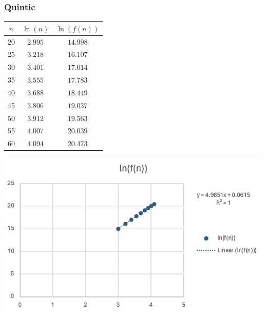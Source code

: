\documentclass{article}
\begin{document}
    \subsubsection{Quintic}

\begin{minipage}{0.3\textwidth} %
    \centering

    
    
    \begin{tabular}{c|c|c}
        $n$ & $\ln(n)$ & $\ln(f(n))$ \\ \hline
        20 & $2.995$ & $14.998$ \\\hline
        25 & $3.218$ & $16.107$  \\\hline
        30 & $3.401$ & $17.014$\\\hline
        35 & $3.555$ & $17.783$\\\hline
        40 & $3.688$ & $18.449$\\ \hline
        45 & $3.806$ & $19.037$\\ \hline
        50 & $3.912$ & $19.563$\\ \hline
        55 & $4.007$ & $20.039$\\ \hline
        60 & $4.094$ & $20.473$\\
    \end{tabular}

    
    
\end{minipage}%
\begin{minipage}{0.6\textwidth} %

    

    \centering
    \includegraphics[width=1\linewidth]{Graphs/n^5+8n^3+n.png} %

     
    
\end{minipage}\noindent
\newpage
\end{document}
